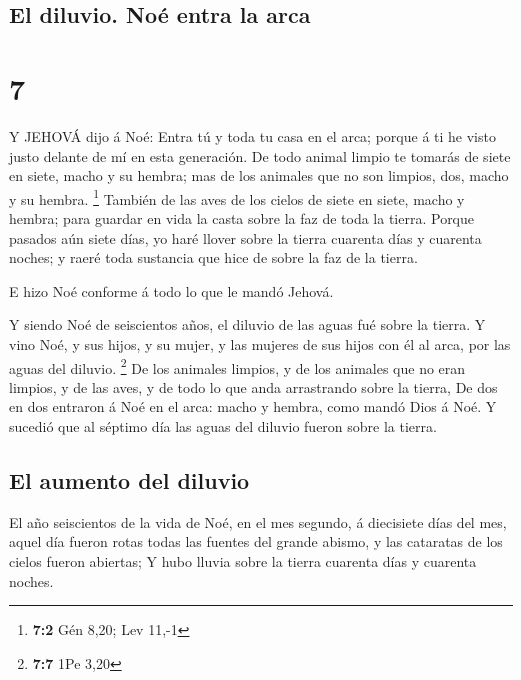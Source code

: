 \hypertarget{el-diluvio.-nouxe9-entra-la-arca}{%
\subsection{El diluvio. Noé entra la
arca}\label{el-diluvio.-nouxe9-entra-la-arca}}

\hypertarget{section-6}{%
\section{7}\label{section-6}}

 Y JEHOVÁ dijo á Noé: Entra tú y toda tu casa en el arca;
porque á ti he visto justo delante de mí en esta generación.
 De todo animal limpio te tomarás de siete en siete, macho y
su hembra; mas de los animales que no son limpios, dos, macho y su
hembra. \footnote{\textbf{7:2} Gén 8,20; Lev 11,-1}  También
de las aves de los cielos de siete en siete, macho y hembra; para
guardar en vida la casta sobre la faz de toda la tierra. 
Porque pasados aún siete días, yo haré llover sobre la tierra cuarenta
días y cuarenta noches; y raeré toda sustancia que hice de sobre la faz
de la tierra.

 E hizo Noé conforme á todo lo que le mandó Jehová.

 Y siendo Noé de seiscientos años, el diluvio de las aguas
fué sobre la tierra.  Y vino Noé, y sus hijos, y su mujer, y
las mujeres de sus hijos con él al arca, por las aguas del diluvio.
\footnote{\textbf{7:7} 1Pe 3,20}  De los animales limpios, y
de los animales que no eran limpios, y de las aves, y de todo lo que
anda arrastrando sobre la tierra,  De dos en dos entraron á
Noé en el arca: macho y hembra, como mandó Dios á Noé.  Y
sucedió que al séptimo día las aguas del diluvio fueron sobre la tierra.

\hypertarget{el-aumento-del-diluvio}{%
\subsection{El aumento del diluvio}\label{el-aumento-del-diluvio}}

 El año seiscientos de la vida de Noé, en el mes segundo, á
diecisiete días del mes, aquel día fueron rotas todas las fuentes del
grande abismo, y las cataratas de los cielos fueron abiertas;
 Y hubo lluvia sobre la tierra cuarenta días y cuarenta
noches.

